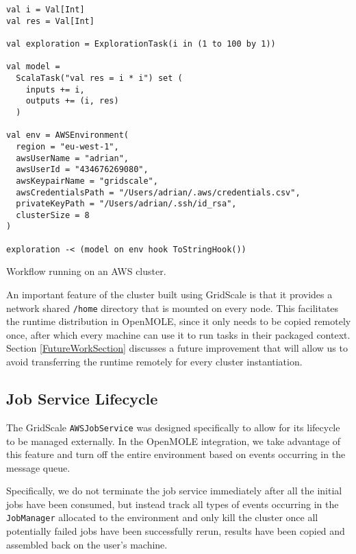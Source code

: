 \begin{listing}[h]
	\centering
	\begin{minipage}{11.4cm}
		\begin{verbatim}
val i = Val[Int]
val res = Val[Int]

val exploration = ExplorationTask(i in (1 to 100 by 1))

val model =
  ScalaTask("val res = i * i") set (
    inputs += i,
    outputs += (i, res)
  )

val env = AWSEnvironment(
  region = "eu-west-1",
  awsUserName = "adrian",
  awsUserId = "434676269080",
  awsKeypairName = "gridscale",
  awsCredentialsPath = "/Users/adrian/.aws/credentials.csv",
  privateKeyPath = "/Users/adrian/.ssh/id_rsa",
  clusterSize = 8
)
  
exploration -< (model on env hook ToStringHook())
		\end{verbatim}
	\end{minipage}
	\caption{Workflow running on an AWS cluster.}
	\label{AWSEnvironment}
\end{listing}

An important feature of the cluster built using GridScale is that it provides a network shared \verb|/home| directory that is mounted on every node. This facilitates the runtime distribution in OpenMOLE, since it only needs to be copied remotely once, after which every machine can use it to run tasks in their packaged context. Section \ref{FutureWorkSection} discusses a future improvement that will allow us to avoid transferring the runtime remotely for every cluster instantiation.

\subsection{Job Service Lifecycle}

The GridScale \verb|AWSJobService| was designed specifically to allow for its lifecycle to be managed externally. In the OpenMOLE integration, we take advantage of this feature and turn off the entire environment based on events occurring in the message queue.

Specifically, we do not terminate the job service immediately after all the initial jobs have been consumed, but instead track all types of events occurring in the \verb|JobManager| allocated to the environment and only kill the cluster once all potentially failed jobs have been successfully rerun, results have been copied and assembled back on the user's machine.

